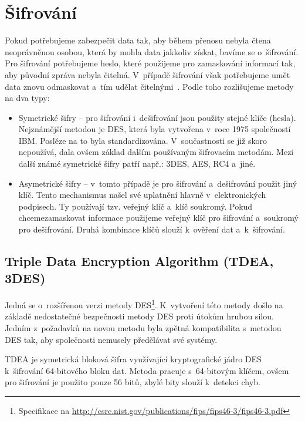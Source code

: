 \section{Šifrování}
Pokud potřebujeme zabezpečit data tak, aby během přenosu nebyla čtena neoprávněnou osobou, která by
mohla data jakkoliv získat, bavíme se o~šifrování. Pro šifrování potřebujeme heslo, které použijeme
pro zamaskování informací tak, aby původní zpráva nebyla čitelná. V~případě šifrování však
potřebujeme umět data znovu odmaskovat a~tím udělat čitelnými~\cite{AC:1996}. Podle toho rozlišujeme metody na dva
typy:
\begin{itemize}
    \item Symetrické šifry -- pro šifrování i~dešifrování jsou použity stejné klíče (hesla).
        Nejznámější metodou je DES, která byla vytvořena v~roce 1975 společností IBM. Posléze na to
        byla standardizována. V~součastnosti se již skoro nepoužívá, dala ovšem základ dalším
        používaným šifrovacím metodám. Mezi další známé symetrické šifry patří např.: 3DES, AES, RC4
        a~jiné.
    \item Asymetrické šifry -- v~tomto případě je pro šifrování a~dešifrování použit jiný klíč.
        Tento mechanismus našel své uplatnění hlavně v~elektronických podpisech. Ty používají tzv.
        veřejný klíč a~klíč soukromý. Pokud chcemezamaskovat informace použijeme veřejný klíč pro
        šifrování a~soukromý pro dešifrování. Druhá kombinace klíčů slouží k~ověření dat a~k~šifrování.
\end{itemize}

\subsection{Triple Data Encryption Algorithm (TDEA, 3DES)}
Jedná se o~rozšířenou verzi metody
DES\footnote{Specifikace na \url{http://csrc.nist.gov/publications/fips/fips46-3/fips46-3.pdf}}.
K~vytvoření této metody došlo na základě nedostatečné bezpečnosti metody DES proti útokům hrubou
silou. Jedním z~požadavků na novou metodu byla zpětná kompatibilita s~metodou DES tak, aby
společnosti nemusely předělávat své systémy.

TDEA je symetrická bloková šifra využívající kryptografické jádro DES k~šifrování 64-bitového bloku
dat. Metoda pracuje s~64-bitovým klíčem, ovšem pro šifrování je použito pouze 56 bitů, zbylé bity
slouží k~detekci chyb. 

